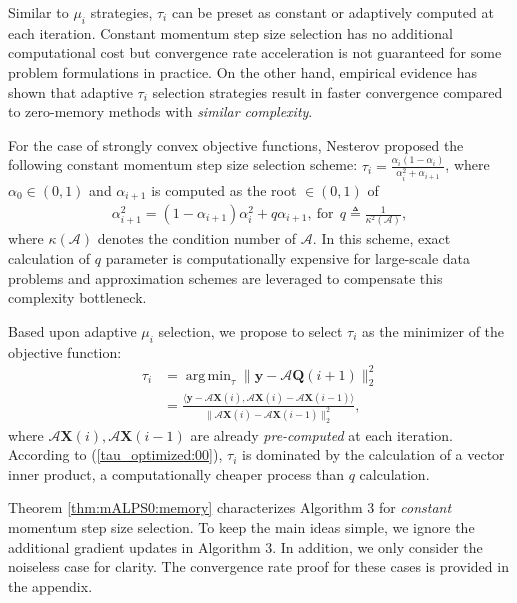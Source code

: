 \documentclass[twocolumn]{svjour3}
\newcommand{\vectornorm}[1]{\|#1\|}
\newcommand{\obs}{\boldsymbol{y}}
\newcommand{\sensing}{\boldsymbol{\mathcal{A}}}
\newcommand{\signal}{\boldsymbol{X}}
\DeclareMathOperator*{\argmin}{arg\,min}
\begin{document}
Similar to $ \mu_i $ strategies, $ \tau_i $ can be preset as constant or adaptively computed at each iteration. Constant momentum step size selection has no additional computational cost but convergence rate acceleration is not guaranteed for some problem formulations in practice. On the other hand, empirical evidence has shown that adaptive $ \tau_i $ selection strategies result in faster convergence compared to zero-memory methods with {\it similar complexity}. 

For the case of strongly convex objective functions, Nesterov \cite{nesterov} proposed the following constant momentum step size selection scheme:
$\tau_i = \frac{\alpha_i(1-\alpha_i)}{\alpha_i^2 + \alpha_{i+1}} $, where $ \alpha_0 \in (0,1) $ and $ \alpha_{i+1} $ is computed as the root $ \in (0,1) $ of
\begin{align}
\alpha_{i+1}^2 = (1 - \alpha_{i+1}) \alpha_i^2 + q\alpha_{i+1},  ~\text{for}~~q \triangleq \frac{1}{\kappa^2(\sensing)}, 
\end{align} where $ \kappa(\sensing) $ denotes the condition number of $ \sensing $. In this scheme, exact calculation of $ q $ parameter is computationally expensive for large-scale data problems and approximation schemes are leveraged to compensate this complexity bottleneck.

Based upon adaptive $ \mu_i $ selection, we propose to select $ \tau_i $ as the minimizer of the objective function:
\begin{align}
\tau_i &= \argmin_{\tau} \vectornorm{\obs - \sensing \boldsymbol{Q}(i+1)}_2^2  \nonumber \\ 
       &= \frac{\langle \obs - \sensing \signal(i), \sensing \signal(i) - \sensing \signal(i-1)\rangle }{\vectornorm{\sensing \signal(i) - \sensing \signal(i-1)}_2^2}, \label{tau_optimized:00}
\end{align} where $ \sensing \signal(i), \sensing \signal(i-1) $ are already {\it pre-computed} at each iteration. According to (\ref{tau_optimized:00}), $ \tau_i $ is dominated by the calculation of a vector inner product, a computationally cheaper process than $ q $ calculation. 

Theorem \ref{thm:mALPS0:memory} characterizes Algorithm 3 for {\it constant} momentum step size selection. To keep the main ideas simple, we ignore the additional gradient updates in Algorithm 3. In addition, we only consider the noiseless case for clarity. The convergence rate proof for these cases is provided in the appendix.
\end{document}
